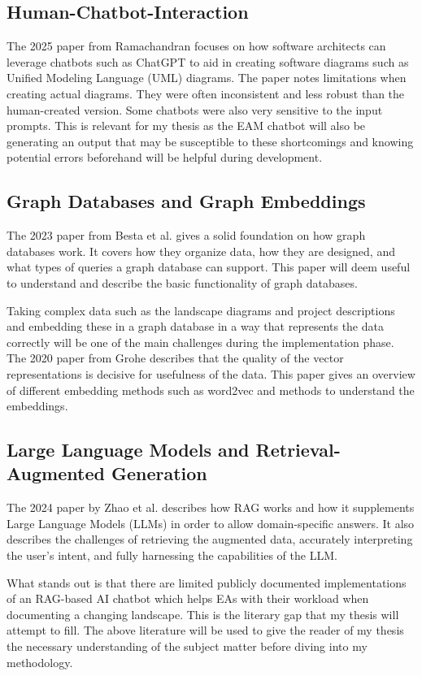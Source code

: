 \documentclass[english]{lni}
\begin{document}
\subsection{Human-Chatbot-Interaction}
The 2025 paper from Ramachandran \cite{ramachandran2025transforming} focuses on how software architects can leverage chatbots such as ChatGPT to aid in creating software diagrams such as Unified Modeling Language (UML) diagrams. The paper notes limitations when creating actual diagrams. They were often inconsistent and less robust than the human-created version. Some chatbots were also very sensitive to the input prompts. This is relevant for my thesis as the EAM chatbot will also be generating an output that may be susceptible to these shortcomings and knowing potential errors beforehand will be helpful during development.

\subsection{Graph Databases and Graph Embeddings}
The 2023 paper from Besta et al. \cite{besta2023demystifying} gives a solid foundation on how graph databases work. It covers how they organize data, how they are designed, and what types of queries a graph database can support. This paper will deem useful to understand and describe the basic functionality of graph databases.

Taking complex data such as the landscape diagrams and project descriptions and embedding these in a graph database in a way that represents the data correctly will be one of the main challenges during the implementation phase. The 2020 paper from Grohe \cite{grohe2020word2vec} describes that the quality of the vector representations is decisive for usefulness of the data. This paper gives an overview of different embedding methods such as word2vec and methods to understand the embeddings.

\subsection{Large Language Models and Retrieval-Augmented Generation}
The 2024 paper by Zhao et al. \cite{zhao2024retrieval} describes how RAG works and how it supplements Large Language Models (LLMs) in order to allow domain-specific answers. It also describes the challenges of retrieving the augmented data, accurately interpreting the user's intent, and fully harnessing the capabilities of the LLM.

What stands out is that there are limited publicly documented implementations of an RAG-based AI chatbot which helps EAs with their workload when documenting a changing landscape. This is the literary gap that my thesis will attempt to fill. The above literature will be used to give the reader of my thesis the necessary understanding of the subject matter before diving into my methodology.
\end{document}
